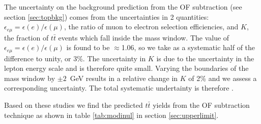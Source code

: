 The uncertainty on the background prediction from the OF subtraction (see section \ref{sec:topbkg}) 
comes from the uncertainties in 2
quantities: $\epsilon_{e\mu} = \epsilon(e)/\epsilon(\mu)$, the ratio of muon to electron selection 
efficiencies,
and $K$, the fraction of $t\bar{t}$ events which fall inside the \Z mass window.
The value of $\epsilon_{e\mu} = \epsilon(e)/\epsilon(\mu)$ is found to be 
$\approx$1.06, so we take as a 
systematic half of the difference to unity, or 3\%.
%
%
%
The uncertainty in $K$ is due to the uncertainty in the lepton energy scale and is therefore quite small.
Varying the boundaries of the \Z mass window by $\pm2$~GeV results in a relative change in $K$ of 2\% 
and we assess a corresponding uncertainty. 
The total systematic undertainty is therefore \ofsystpercentage.

Based on these studies we find the predicted $t\bar{t}$ yields from the OF subtraction technique 
as shown in table \ref{tab:modinul} in section \ref{sec:upperlimit}.


\begin{comment}

\begin{table}[hbt]
  \begin{center}
	\caption{
	  \label{tab:ofsystres} 
	  Results of assessing \ofsystpercentage systematics to the OF prediction shown in figure \ref{fig:pfmet_eemm}.
	}
	\begin{tabular}{lcccc}
	  \hline
	  \resulttitle
\hline

OFOS Pred &  54.77 $\pm$ 2.95 $\pm$ 1.97  &    34.73 $\pm$ 2.35 $\pm$ 1.25  &    11.76 $\pm$ 1.37 $\pm$ 0.42  &     1.13 $\pm$ 0.46 $\pm$ 0.04 \\

\hline
	\end{tabular}
  \end{center}
\end{table}

\end{comment}

